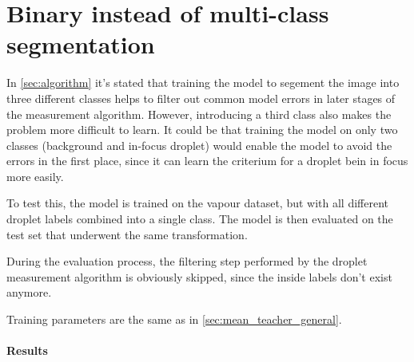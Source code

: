 \section{Binary instead of multi-class segmentation}
\label{sec:binary}

In \ref{sec:algorithm} it's stated that training the model to segement the image into three different classes helps to filter out common model errors in later stages of the measurement algorithm. 
However, introducing a third class also makes the problem more difficult to learn. It could be that training the model on only two classes (background and in-focus droplet) would enable the model to avoid the errors in the first place, since it can learn the criterium for a droplet bein in focus more easily.

To test this, the model is trained on the vapour dataset, but with all different droplet labels combined into a single class. The model is then evaluated on the test set that underwent the same transformation. 

During the evaluation process, the filtering step performed by the droplet measurement algorithm is obviously skipped, since the inside labels don't exist anymore. 

Training parameters are the same as in \ref{sec:mean_teacher_general}.

\paragraph{Results}

